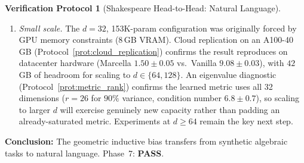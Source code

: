 \documentclass[11pt,a4paper]{article}
\theoremstyle{definition}
\newtheorem{protocol}[theorem]{Verification Protocol}
\theoremstyle{remark}
\begin{document}
\begin{protocol}[Shakespeare Head-to-Head: Natural Language]
\begin{enumerate}[nosep]
  \item \emph{Small scale.} The $d = 32$, 153K-param configuration 
  was originally forced by GPU memory constraints (8\,GB VRAM). 
  Cloud replication on an A100-40\,GB 
  (Protocol~\ref{prot:cloud_replication}) confirms the result 
  reproduces on datacenter hardware (Marcella $1.50 \pm 0.05$ 
  vs.\ Vanilla $9.08 \pm 0.03$), with $42$\,GB of headroom for 
  scaling to $d \in \{64, 128\}$.  An eigenvalue diagnostic 
  (Protocol~\ref{prot:metric_rank}) confirms the learned metric 
  uses all 32 dimensions ($r = 26$ for $90\%$ variance, condition 
  number $6.8 \pm 0.7$), so scaling to larger $d$ will exercise 
  genuinely new capacity rather than padding an already-saturated 
  metric.  Experiments at $d \geq 64$ remain the key next step.
\end{enumerate}

\textbf{Conclusion:} The geometric inductive bias transfers from 
synthetic algebraic tasks to natural language. Phase~7: 
\textbf{PASS}.
\end{protocol}
\end{document}
